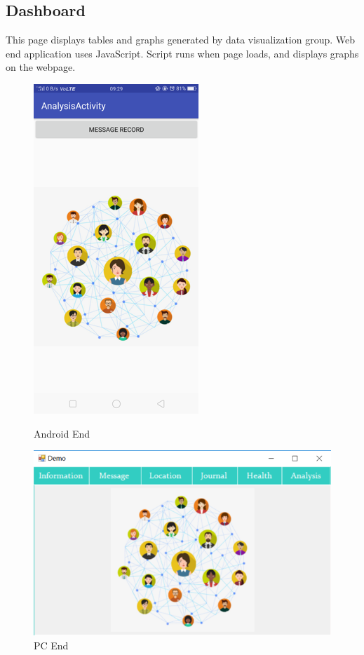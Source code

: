 \documentclass{article}
\begin{document}
\subsection{Dashboard}
This page displays tables and graphs generated by data visualization group. Web end application uses JavaScript. Script runs when page loads, and displays graphs on the webpage.
 	\begin{figure}[H] 	
 		\begin{minipage}[b]{0.28\linewidth}
		 	\centering
	 		\includegraphics{img/social3.png}
 			\caption{Android End}
 		\end{minipage}
 		\begin{minipage}[b]{0.68\linewidth} 		
 	 		\centering
 			\includegraphics{img/social1.png}
 			\caption{PC End}
	 	\end{minipage}
 	\end{figure}
 	
\end{document}
